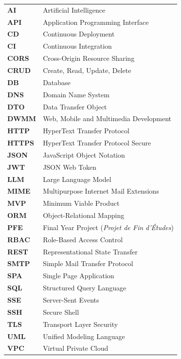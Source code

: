\documentclass[12pt, a4paper, oneside]{report}
\begin{document}
\begin{tabular}{ll}
  \textbf{AI}     & Artificial Intelligence \\
  \textbf{API}    & Application Programming Interface \\
  \textbf{CD}     & Continuous Deployment \\
  \textbf{CI}     & Continuous Integration \\
  \textbf{CORS}   & Cross-Origin Resource Sharing \\
  \textbf{CRUD}   & Create, Read, Update, Delete \\
  \textbf{DB}     & Database \\
  \textbf{DNS}    & Domain Name System \\
  \textbf{DTO}    & Data Transfer Object \\
  \textbf{DWMM}   & Web, Mobile and Multimedia Development \\
  \textbf{HTTP}   & HyperText Transfer Protocol \\
  \textbf{HTTPS}  & HyperText Transfer Protocol Secure \\
  \textbf{JSON}   & JavaScript Object Notation \\
  \textbf{JWT}    & JSON Web Token \\
  \textbf{LLM}    & Large Language Model \\
  \textbf{MIME}   & Multipurpose Internet Mail Extensions \\
  \textbf{MVP}    & Minimum Viable Product \\
  \textbf{ORM}    & Object-Relational Mapping \\
  \textbf{PFE}    & Final Year Project (\textit{Projet de Fin d'\'Etudes}) \\
  \textbf{RBAC}   & Role-Based Access Control \\
  \textbf{REST}   & Representational State Transfer \\
  \textbf{SMTP}   & Simple Mail Transfer Protocol \\
  \textbf{SPA}    & Single Page Application \\
  \textbf{SQL}    & Structured Query Language \\
  \textbf{SSE}    & Server-Sent Events \\
  \textbf{SSH}    & Secure Shell \\
  \textbf{TLS}    & Transport Layer Security \\
  \textbf{UML}    & Unified Modeling Language \\
  \textbf{VPC}    & Virtual Private Cloud \\
\end{tabular}
\end{document}
